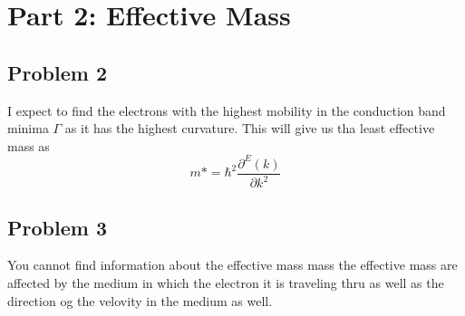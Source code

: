 \section{Part 2: Effective Mass}

\subsection*{Problem 2}
I expect to find the electrons with the highest mobility in the conduction band minima $\Gamma$ as it has the highest curvature. This will give us tha least effective mass as
\begin{equation*}
    m*=\hbar^2 \frac{\partial ^E(k)}{\partial k^2}
\end{equation*}

\subsection*{Problem 3}

You cannot find information about the effective mass mass the effective mass are affected by the medium in which the electron it is traveling thru as well as the direction og the velovity in the medium as well.